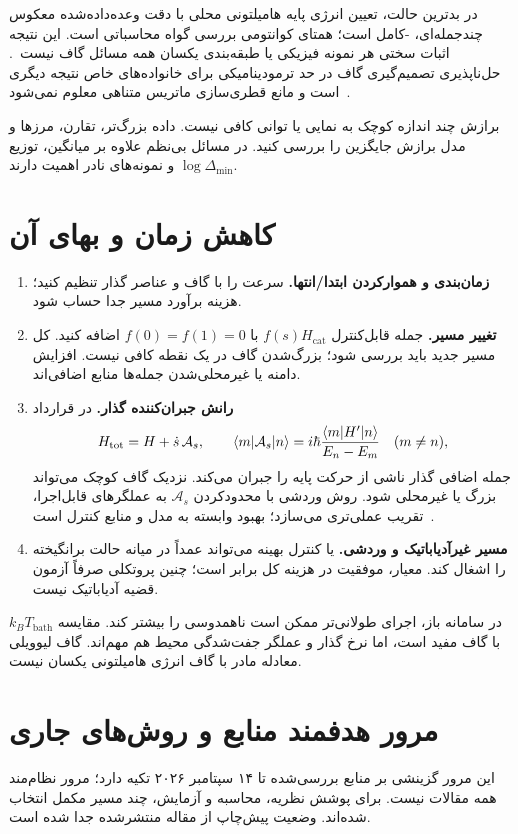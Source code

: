 در بدترین حالت، تعیین انرژی پایه هامیلتونی محلی با دقت وعده‌داده‌شده معکوس چندجمله‌ای، -کامل است؛  همتای کوانتومی بررسی گواه محاسباتی است.
این نتیجه اثبات سختی هر نمونه فیزیکی یا طبقه‌بندی یکسان همه مسائل گاف نیست~\cite{GapGharibian2015}.
حل‌ناپذیری تصمیم‌گیری گاف در حد ترمودینامیکی برای خانواده‌های خاص نتیجه دیگری است و مانع قطری‌سازی ماتریس متناهی معلوم نمی‌شود~\cite{GapCubitt2015}.

برازش چند اندازه کوچک به نمایی یا توانی کافی نیست. داده بزرگ‌تر، تقارن، مرزها و مدل برازش جایگزین را بررسی کنید.
در مسائل بی‌نظم علاوه بر میانگین، توزیع $\log\Delta_{\min}$ و نمونه‌های نادر اهمیت دارند.

\section{کاهش زمان و بهای آن}
\label{sec:gap-control}
\begin{enumerate}
	\item \textbf{زمان‌بندی و هموارکردن ابتدا/انتها.}
	سرعت را با گاف و عناصر گذار تنظیم کنید؛ هزینه برآورد مسیر جدا حساب شود.
	\item \textbf{تغییر مسیر.}
	جمله قابل‌کنترل $f(s)H_{\mathrm{cat}}$ با $f(0)=f(1)=0$ اضافه کنید.
	کل مسیر جدید باید بررسی شود؛ بزرگ‌شدن گاف در یک نقطه کافی نیست.
	افزایش دامنه یا غیرمحلی‌شدن جمله‌ها منابع اضافی‌اند.
	\item \textbf{رانش جبران‌کننده گذار.}
	در قرارداد
	\begin{equation}
		H_{\mathrm{tot}}=H+\dot s\,{\cal A}_s,\qquad
		\langle m|{\cal A}_s|n\rangle
		=i\hbar\frac{\langle m|H'|n\rangle}{E_n-E_m}\quad(m\ne n),
	\end{equation}
	جمله اضافی گذار ناشی از حرکت پایه را جبران می‌کند. نزدیک گاف کوچک می‌تواند بزرگ یا غیرمحلی شود.
	روش وردشی  با محدودکردن $\mathcal{A}_s$ به عملگرهای قابل‌اجرا، تقریب عملی‌تری می‌سازد؛ بهبود وابسته به مدل و منابع کنترل است~\cite{GapSels2017}.
	\item \textbf{مسیر غیرآدیاباتیک و وردشی.}
	 یا کنترل بهینه می‌تواند عمداً در میانه حالت برانگیخته را اشغال کند.
	معیار، موفقیت در هزینه کل برابر است؛ چنین پروتکلی صرفاً آزمون قضیه آدیاباتیک نیست.
\end{enumerate}
در سامانه باز، اجرای طولانی‌تر ممکن است ناهمدوسی را بیشتر کند.
مقایسه $k_BT_{\mathrm{bath}}$ با گاف مفید است، اما نرخ گذار و عملگر جفت‌شدگی محیط هم مهم‌اند.
گاف لیوویلی معادله مادر با گاف انرژی هامیلتونی یکسان نیست.

\section{مرور هدفمند منابع و روش‌های جاری}
\label{sec:gap-papers}
این مرور گزینشی بر منابع بررسی‌شده تا ۱۴ سپتامبر ۲۰۲۶ تکیه دارد؛ مرور نظام‌مند همه مقالات نیست.
برای پوشش نظریه، محاسبه و آزمایش، چند مسیر مکمل انتخاب شده‌اند.
وضعیت پیش‌چاپ از مقاله منتشرشده جدا شده است.

